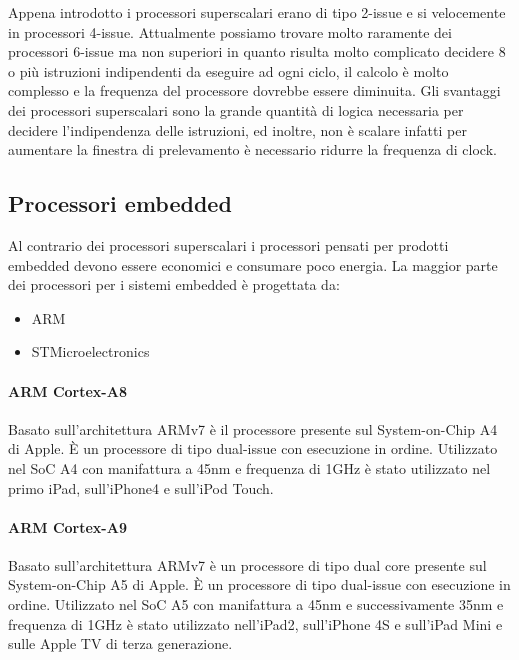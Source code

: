 Appena introdotto i processori superscalari erano di tipo 2-issue e si  velocemente in processori  4-issue. Attualmente possiamo trovare molto raramente dei processori 6-issue ma non superiori in quanto risulta molto complicato decidere 8 o più istruzioni indipendenti da eseguire ad ogni ciclo, il calcolo è molto complesso e la frequenza del processore dovrebbe essere diminuita. Gli svantaggi dei processori superscalari sono la grande quantità di logica necessaria per decidere l'indipendenza delle istruzioni, ed inoltre, non è scalare infatti per aumentare la finestra di prelevamento è necessario ridurre la frequenza di clock.
\subsection{Processori embedded}
Al contrario dei processori superscalari i processori pensati per prodotti embedded devono essere economici e consumare poco energia. La maggior parte dei processori per i sistemi embedded è progettata da:
\begin{itemize}
\item ARM
\item STMicroelectronics
\end{itemize}
\paragraph{ARM Cortex-A8}
Basato sull'architettura ARMv7 è il processore presente sul System-on-Chip A4 di Apple. \uppercase{è} un processore di tipo dual-issue con esecuzione in ordine. Utilizzato nel SoC A4 con manifattura a 45nm e frequenza di 1GHz è stato utilizzato nel primo iPad, sull'iPhone4 e sull'iPod Touch.
\paragraph{ARM Cortex-A9}
Basato sull'architettura ARMv7 è un processore di tipo dual core presente sul System-on-Chip A5 di Apple. \uppercase{è} un processore di tipo dual-issue con esecuzione in ordine. Utilizzato nel SoC A5 con manifattura a 45nm e successivamente 35nm e frequenza di 1GHz è stato utilizzato nell'iPad2, sull'iPhone 4S e sull'iPad Mini e sulle Apple TV di terza generazione.
